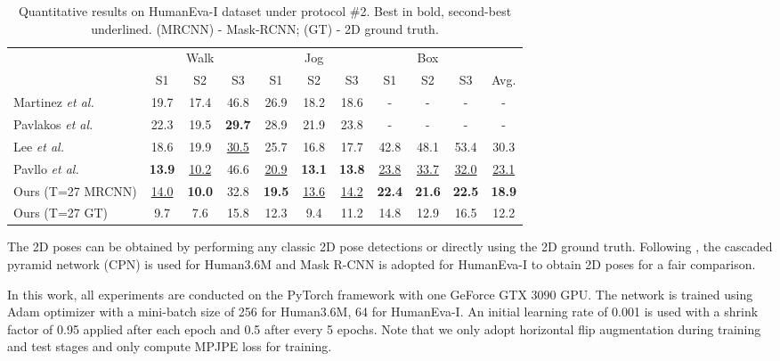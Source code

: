 \documentclass[10pt,twocolumn,letterpaper]{article}
\begin{document}
 \begin{table}
   \centering
   \resizebox{\linewidth}{!}
   {
     \begin{tabular}{@{}l|ccc|ccc|ccc|c@{}}
       \toprule[1pt]
       & \multicolumn{3}{c}{Walk} & \multicolumn{3}{c}{Jog} &
       \multicolumn{3}{c}{Box} \\
     & S1 & S2 & S3 & S1 & S2 & S3 & S1 & S2 & S3 & Avg. \\
     \midrule[0.5pt]

     Martinez \emph{et al.} \cite{martinez2017simple} &19.7 &17.4 &46.8 &26.9 &18.2 &18.6 &- &- &- &-\\

     Pavlakos \emph{et al.} \cite{pavlakos2017coarse} &22.3 &19.5 &\textbf{29.7} &28.9 &21.9 &23.8 &- &- &- &-\\

     Lee \emph{et al.} \cite{lee2018propagating} &18.6 &19.9 &\underline{30.5} &25.7 &16.8 &17.7 &42.8 &48.1 &53.4 &30.3 \\

     Pavllo \emph{et al.} \cite{pavllo20193d} &\textbf{13.9} &\underline{10.2} &46.6 &\underline{20.9} &\textbf{13.1} &\textbf{13.8} &\underline{23.8} &\underline{33.7} &\underline{32.0} &\underline{23.1} \\

     \midrule[0.5pt]
     Ours (T=27 MRCNN) &\underline{14.0} &\textbf{10.0} &32.8 &\textbf{19.5} &\underline{13.6} &\underline{14.2} &\textbf{22.4} &\textbf{21.6} &\textbf{22.5} &\textbf{18.9} \\
     \midrule[0.5pt]

     Ours (T=27 GT) &9.7 &7.6 &15.8 &12.3 &9.4 &11.2 &14.8 &12.9 &16.5 &12.2 \\
     \toprule[1pt]
     \end{tabular}
   }
   \caption
   {
      Quantitative results on HumanEva-I dataset under protocol \#2. 
      Best in bold, second-best underlined.
      (MRCNN) - Mask-RCNN; 
      (GT) - 2D ground truth. 
   }
   \label{table:humaneva_eval}
 \end{table} 

The 2D poses can be obtained by performing any classic 2D pose detections or directly using the 2D ground truth. 
Following \cite{pavllo20193d}, the cascaded pyramid network (CPN) \cite{chen2018cascaded} is used for Human3.6M and Mask R-CNN \cite{he2017mask} is adopted for HumanEva-I to obtain 2D poses for a fair comparison. 

In this work, all experiments are conducted on the PyTorch framework with one GeForce GTX 3090 GPU.
The network is trained using Adam optimizer with a mini-batch size of 256 for Human3.6M, 64 for HumanEva-I. 
An initial learning rate of 0.001 is used with a shrink factor of 0.95  applied after each epoch and 0.5 after every 5 epochs. 
Note that we only adopt horizontal flip augmentation during training and test stages and only compute MPJPE loss for training. 
\end{document}
